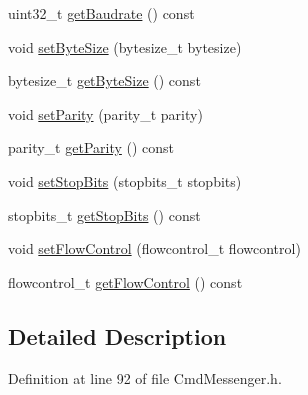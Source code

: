 \begin{DoxyCompactItemize}
\item 
uint32\+\_\+t \hyperlink{classcmd_1_1_cmd_messenger_a14c580579b5311ff78cce8de34fe63b2}{get\+Baudrate} () const 
\item 
void \hyperlink{classcmd_1_1_cmd_messenger_ae05db8b37c1b2ee9be47ea3a3bf045bd}{set\+Byte\+Size} (bytesize\+\_\+t bytesize)
\item 
bytesize\+\_\+t \hyperlink{classcmd_1_1_cmd_messenger_a8ccc24a1f621afd1e114696ed9b8b261}{get\+Byte\+Size} () const 
\item 
void \hyperlink{classcmd_1_1_cmd_messenger_ae0bbc0b786fadff310f31c84644b56c5}{set\+Parity} (parity\+\_\+t parity)
\item 
parity\+\_\+t \hyperlink{classcmd_1_1_cmd_messenger_ad487f6fd40a2bffc69fab5334d96ab52}{get\+Parity} () const 
\item 
void \hyperlink{classcmd_1_1_cmd_messenger_a06eaedc3c9e7b0b3cda7b139ee61f5bb}{set\+Stop\+Bits} (stopbits\+\_\+t stopbits)
\item 
stopbits\+\_\+t \hyperlink{classcmd_1_1_cmd_messenger_a2dd6e45584ed65ff1f744e46198e7755}{get\+Stop\+Bits} () const 
\item 
void \hyperlink{classcmd_1_1_cmd_messenger_a5271d79b0f4ae95bea5897b214fbbd4c}{set\+Flow\+Control} (flowcontrol\+\_\+t flowcontrol)
\item 
flowcontrol\+\_\+t \hyperlink{classcmd_1_1_cmd_messenger_a11e2bea7282a912fd05644b403b55503}{get\+Flow\+Control} () const 
\end{DoxyCompactItemize}


\subsection{Detailed Description}


Definition at line 92 of file Cmd\+Messenger.\+h.




